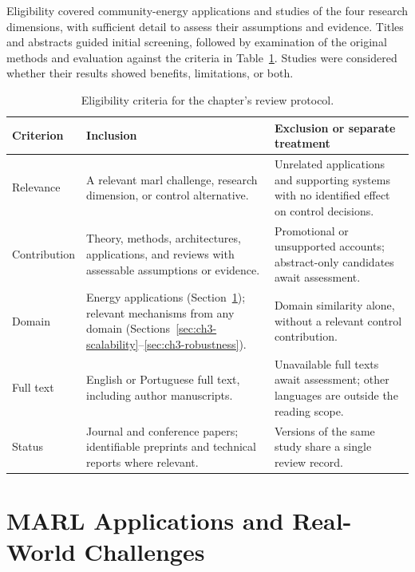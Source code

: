 Eligibility covered community-energy applications and studies of the four research dimensions, with sufficient detail to assess their assumptions and evidence. Titles and abstracts guided initial screening, followed by examination of the original methods and evaluation against the criteria in Table~\ref{tab:ch3-eligibility}. Studies were considered whether their results showed benefits, limitations, or both.

\begin{table}[!htbp]
\centering
\caption{Eligibility criteria for the chapter's review protocol.}
\label{tab:ch3-eligibility}
\small
\setlength{\tabcolsep}{5pt}
\renewcommand{\arraystretch}{1.13}
\begin{tabularx}{\textwidth}{@{}>{\raggedright\arraybackslash}p{}>{\raggedright\arraybackslash}X>{\raggedright\arraybackslash}X@{}}
\toprule
Criterion & Inclusion & Exclusion or separate treatment\\
\midrule
Relevance &
A relevant \gls{marl} challenge, research dimension, or control alternative. &
Unrelated applications and supporting systems with no identified effect on control decisions.\\
\addlinespace
Contribution &
Theory, methods, architectures, applications, and reviews with assessable assumptions or evidence. &
Promotional or unsupported accounts; abstract-only candidates await assessment.\\
\addlinespace
Domain &
Energy applications (Section~\ref{sec:ch3-challenges}); relevant mechanisms from any domain (Sections~\ref{sec:ch3-scalability}--\ref{sec:ch3-robustness}). &
Domain similarity alone, without a relevant control contribution.\\
\addlinespace
Full text &
English or Portuguese full text, including author manuscripts. &
Unavailable full texts await assessment; other languages are outside the reading scope.\\
\addlinespace
Status &
Journal and conference papers; identifiable preprints and technical reports where relevant. &
Versions of the same study share a single review record.\\
\bottomrule
\end{tabularx}
\end{table}

\FloatBarrier
\section{MARL Applications and Real-World Challenges}
\label{sec:ch3-challenges}

